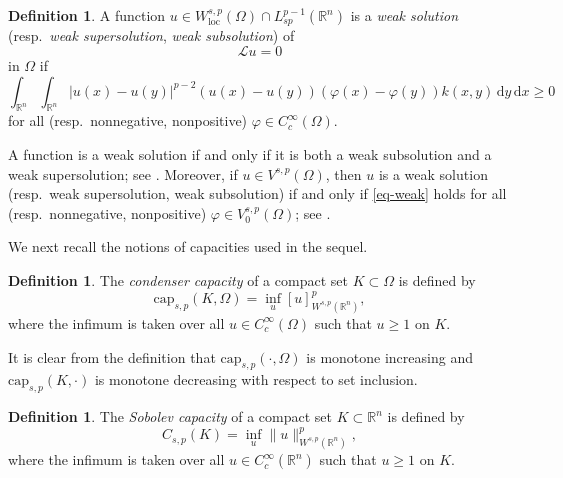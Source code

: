 \documentclass[11pt]{amsart}
\theoremstyle{plain}
\theoremstyle{definition}
\newtheorem{definition}[theorem]{Definition}
\numberwithin{equation}{section}
\begin{document}
\begin{definition}\label{def-weak-soln}
A function $u \in W^{s, p}_{\mathrm{loc}}(\Omega) \cap L^{p-1}_{sp}(\mathbb{R}^n)$ is a {\it weak solution} (resp.\ \emph{weak supersolution}, \emph{weak subsolution}) of
\begin{equation}\label{eq-Lu=0}
\mathcal{L}u=0
\end{equation}
in $\Omega$ if
\begin{equation}\label{eq-weak}
\int_{\mathbb{R}^n} \int_{\mathbb{R}^n} |u(x)-u(y)|^{p-2}(u(x)-u(y))(\varphi(x)-\varphi(y)) k(x, y) \,\mathrm{d}y \,\mathrm{d}x \geq 0
\end{equation}
for all (resp.\ nonnegative, nonpositive) $\varphi \in C_c^{\infty}(\Omega)$.
\end{definition}

A function is a weak solution if and only if it is both a weak subsolution and a weak supersolution; see \cite[Corollary~2.3]{BBK24}. Moreover, if $u \in V^{s, p}(\Omega)$, then $u$ is a weak solution (resp.\ weak supersolution, weak subsolution) if and only if \eqref{eq-weak} holds for all (resp.\ nonnegative, nonpositive) $\varphi \in V^{s, p}_0(\Omega)$; see \cite[Proposition~2.4]{BBK24}.



We next recall the notions of capacities used in the sequel.


\begin{definition}
The \emph{condenser capacity} of a compact set $K \subset \Omega$ is defined by
\begin{equation*}
\mathrm{cap}_{s, p}(K, \Omega) = \inf_u {[u]_{W^{s, p}(\mathbb{R}^n)}^p},
\end{equation*}
where the infimum is taken over all $u \in C^\infty_c(\Omega)$ such that $u \geq 1$ on $K$.
\end{definition}

It is clear from the definition that $\mathrm{cap}_{s, p}(\cdot, \Omega)$ is monotone increasing and $\mathrm{cap}_{s, p}(K, \cdot)$ is monotone decreasing with respect to set inclusion.

\begin{definition}
The \emph{Sobolev capacity} of a compact set $K \subset \mathbb{R}^n$ is defined by
\begin{equation*}
C_{s, p}(K) = \inf_u {\|u\|_{W^{s, p}(\mathbb{R}^n)}^p},
\end{equation*}
where the infimum is taken over all $u \in C^\infty_c(\mathbb{R}^n)$ such that $u \geq 1$ on $K$.
\end{definition}
\end{document}
